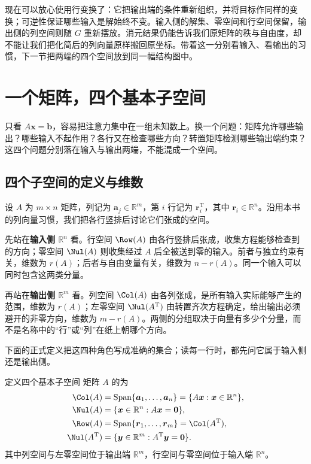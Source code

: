 \documentclass[a4paper,12pt,twoside,openany,fontset=none]{ctexbook}
\newcounter{definition}[chapter]
\newenvironment{definition}[1][]{\begin{defBox}{定义}{#1}}{\end{defBox}}
\numberwithin{equation}{chapter}
\begin{document}
现在可以放心使用行变换了：它把输出端的条件重新组织，并将目标作同样的变换；可逆性保证哪些输入是解始终不变。输入侧的解集、零空间和行空间保留，输出侧的列空间则随 $G$ 重新摆放。消元结果仍能告诉我们原矩阵的秩与自由度，却不能让我们把化简后的列向量原样搬回原坐标。带着这一分别看输入、看输出的习惯，下一节把两端的四个空间放到同一幅结构图中。

\section{一个矩阵，四个基本子空间}
\label{sec:five-four-spaces}

只看 $A\boldsymbol x=\boldsymbol b$，容易把注意力集中在一组未知数上。换一个问题：矩阵允许哪些输出？哪些输入不起作用？各行又在检查哪些方向？转置矩阵检测哪些输出端约束？这四个问题分别落在输入与输出两端，不能混成一个空间。

\subsection{四个子空间的定义与维数}

设 $A$ 为 $m\times n$ 矩阵，列记为 $\boldsymbol a_j\in\mathbb R^m$，第 $i$ 行记为 $\boldsymbol r_i^{\mathrm T}$，其中 $\boldsymbol r_i\in\mathbb R^n$。沿用本书的列向量习惯，我们把各行竖排后讨论它们张成的空间。

先站在\textbf{输入侧 $\mathbb R^n$} 看。行空间 $\Row(A)$ 由各行竖排后张成，收集方程能够检查到的方向；零空间 $\Nul(A)$ 则收集经过 $A$ 后全被送到零的输入。前者与独立约束有关，维数为 $r(A)$；后者与自由变量有关，维数为 $n-r(A)$。同一个输入可以同时包含这两类分量。

再站在\textbf{输出侧 $\mathbb R^m$} 看。列空间 $\Col(A)$ 由各列张成，是所有输入实际能够产生的范围，维数为 $r(A)$；左零空间 $\Nul(A^{\mathrm T})$ 由转置齐次方程确定，给出输出必须避开的非零方向，维数为 $m-r(A)$。两侧的分组取决于向量有多少个分量，而不是名称中的“行”或“列”在纸上朝哪个方向。

下面的正式定义把这四种角色写成准确的集合；读每一行时，都先问它属于输入侧还是输出侧。

\begin{definition}[四个基本子空间]
矩阵 $A$ 的为
\begin{align}
 \Col(A)&=\operatorname{Span}\{\boldsymbol a_1,\ldots,\boldsymbol a_n\}
 =\{A\boldsymbol x:\boldsymbol x\in\mathbb R^n\},\\
 \Nul(A)&=\{\boldsymbol x\in\mathbb R^n:A\boldsymbol x=\boldsymbol0\},\\
 \Row(A)&=\operatorname{Span}\{\boldsymbol r_1,\ldots,\boldsymbol r_m\}
 =\Col(A^{\mathrm T}),\\
 \Nul(A^{\mathrm T})&=\{\boldsymbol y\in\mathbb R^m:A^{\mathrm T}\boldsymbol y=\boldsymbol0\}.
\end{align}
其中列空间与左零空间位于输出端 $\mathbb R^m$，行空间与零空间位于输入端 $\mathbb R^n$。
\end{definition}
\end{document}

